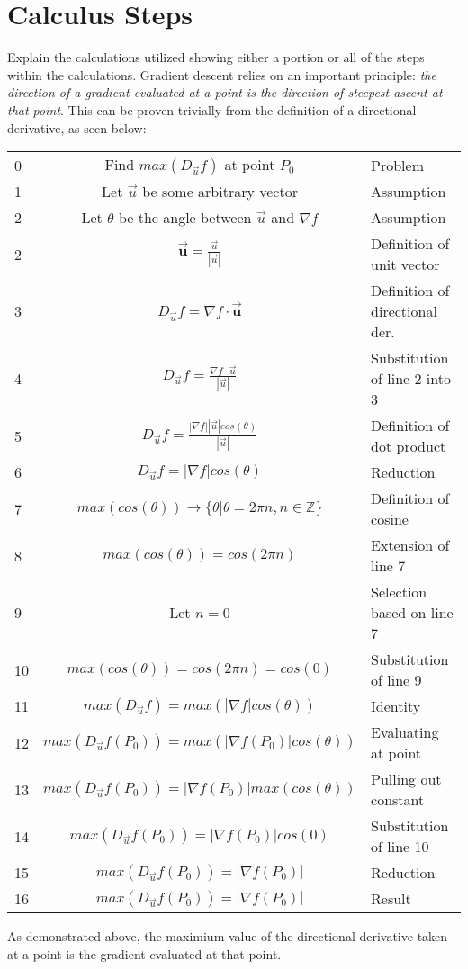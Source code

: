 \documentclass[11pt, a4paper]{article}
\newcommand\fvec[1]{\vec{\textbf{#1}}}
\begin{document}
\section{Calculus Steps}
Explain the calculations utilized showing either a portion or all of the steps within the calculations.
Gradient descent relies on an important principle: \textit{the direction of a gradient evaluated at a 
point is the direction of steepest ascent at that point}. This can be proven trivially from the definition
of a directional derivative, as seen below:
\begin{center}
    \begin{tabular}{l | c | l}
        0 & Find $max(D_{\vec{u}}f)$ at point $P_0$ & Problem\\
        1 & Let $\vec{u}$ be some arbitrary vector & Assumption\\
        2 & Let $\theta$ be the angle between $\vec{u}$ and $\nabla f$ & Assumption \\
        2 & $\fvec{u} = \frac{\vec{u}}{|\vec{u}|}$ & Definition of unit vector\\
        3 & $D_{\vec{u}}f = \nabla f \cdot \fvec{u}$ & Definition of directional der.\\
        4 & $D_{\vec{u}}f = \frac{\nabla f \cdot \vec{u}}{|\vec{u}|}$ & Substitution of line 2 into 3 \\
        5 & $D_{\vec{u}}f = \frac{|\nabla f| |\vec{u}| cos(\theta)}{|\vec{u}|}$ & Definition of dot product \\
        6 & $D_{\vec{u}}f = |\nabla f| cos(\theta)$ & Reduction \\
        7 & $max(cos(\theta)) \rightarrow \{\theta | \theta = 2\pi n, n \in \mathbb{Z}\}$ & Definition of cosine \\
        8 & $max(cos(\theta)) = cos(2\pi n)$ & Extension of line 7 \\
        9 & Let $n = 0$ & Selection based on line 7 \\
        10 & $max(cos(\theta)) = cos(2 \pi n) = cos(0)$ & Substitution of line 9 \\
        11 & $max(D_{\vec{u}}f) = max(|\nabla f| cos(\theta))$ & Identity \\
        12 & $max(D_{\vec{u}}f(P_0)) = max(|\nabla f(P_0)| cos(\theta))$ & Evaluating at point \\
        13 & $max(D_{\vec{u}}f(P_0)) = |\nabla f(P_0)| max(cos(\theta))$ & Pulling out constant \\
        14 & $max(D_{\vec{u}}f(P_0)) = |\nabla f(P_0)| cos(0)$ & Substitution of line 10\\
        15 & $max(D_{\vec{u}}f(P_0)) = |\nabla f(P_0)|$ & Reduction \\
        16 & $max(D_{\vec{u}}f(P_0)) = |\nabla f(P_0)|$ & Result
    \end{tabular}
\end{center}
As demonstrated above, the maximium value of the directional derivative taken at a point is the gradient evaluated at that point.\\
\end{document}
